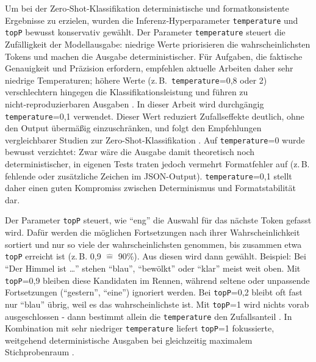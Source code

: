 Um bei der Zero‑Shot‑Klassifikation deterministische und formatkonsistente Ergebnisse zu erzielen, wurden die Inferenz‑Hyperparameter \texttt{temperature} und \texttt{topP} bewusst konservativ gewählt. Der Parameter \texttt{temperature} steuert die Zufälligkeit der Modellausgabe: niedrige Werte priorisieren die wahrscheinlichsten Tokens und machen die Ausgabe deterministischer. Für Aufgaben, die faktische Genauigkeit und Präzision erfordern, empfehlen aktuelle Arbeiten daher sehr niedrige Temperaturen; höhere Werte (z.\,B.\ \texttt{temperature}=0{,}8 oder 2) verschlechtern hingegen die Klassifikationsleistung und führen zu nicht‑reproduzierbaren Ausgaben \cite{renze2024effect,mu2024navigating}. In dieser Arbeit wird durchgängig \texttt{temperature}=0{,}1 verwendet. Dieser Wert reduziert Zufallseffekte deutlich, ohne den Output übermäßig einzuschränken, und folgt den Empfehlungen vergleichbarer Studien zur Zero-Shot-Klassifikation \cite{mu2024navigating}. Auf \texttt{temperature}=0 wurde bewusst verzichtet: Zwar wäre die Ausgabe damit theoretisch noch deterministischer, in eigenen Tests traten jedoch vermehrt Formatfehler auf (z.\,B. fehlende oder zusätzliche Zeichen im JSON-Output). \texttt{temperature}=0{,}1 stellt daher einen guten Kompromiss zwischen Determinismus und Formatstabilität dar.

Der Parameter \texttt{topP} steuert, wie \enquote{eng} die Auswahl für das nächste Token gefasst wird. Dafür werden die möglichen Fortsetzungen nach ihrer Wahrscheinlichkeit sortiert und nur so viele der wahrscheinlichsten genommen, bis zusammen etwa \texttt{topP} erreicht ist (z.\,B. 0{,}9 $\widehat{=}$ 90\%). Aus diesen wird dann gewählt. Beispiel: Bei \enquote{Der Himmel ist \dots} stehen \enquote{blau}, \enquote{bewölkt} oder \enquote{klar} meist weit oben. Mit \texttt{topP}=0{,}9 bleiben diese Kandidaten im Rennen, während seltene oder unpassende Fortsetzungen (\enquote{gestern}, \enquote{eine}) ignoriert werden. Bei \texttt{topP}=0{,}2 bleibt oft fast nur \enquote{blau} übrig, weil es das wahrscheinlichste ist. Mit \texttt{topP}=1 wird nichts vorab ausgeschlossen - dann bestimmt allein die \texttt{temperature} den Zufallsanteil \cite{renze2024effect}. In Kombination mit sehr niedriger \texttt{temperature} liefert \texttt{topP}=1 fokussierte, weitgehend deterministische Ausgaben bei gleichzeitig maximalem Stichprobenraum \cite{mu2024navigating}.